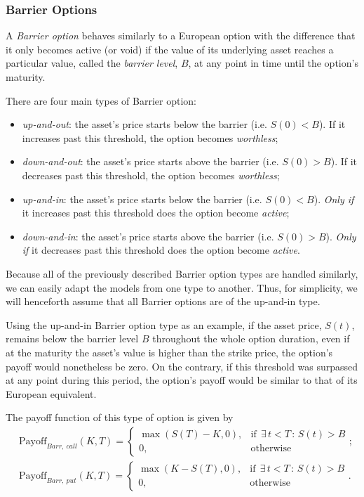 \subsubsection{Barrier Options}
A \emph{Barrier option} behaves similarly to a European option with the difference that it only becomes active (or void) if the value of its underlying asset reaches a particular value, called the \emph{barrier level}, $B$, at any point in time until the option's maturity.

There are four main types of Barrier option:
\begin{itemize}
\item \emph{up-and-out}: the asset's price starts below the barrier (i.e. $S(0)<B$). If it increases past this threshold, the option becomes \emph{worthless};
\item \emph{down-and-out}: the asset's price starts above the barrier (i.e. $S(0)>B$). If it decreases past this threshold, the option becomes \emph{worthless};
\item \emph{up-and-in}: the asset's price starts below the barrier (i.e. $S(0)<B$). \emph{Only if} it increases past this threshold does the option become \emph{active};
\item \emph{down-and-in}: the asset's price starts above the barrier (i.e. $S(0)>B$). \emph{Only if} it decreases past this threshold does the option become \emph{active}.
\end{itemize}

Because all of the previously described Barrier option types are handled similarly, we can easily adapt the models from one type to another. Thus, for simplicity, we will henceforth assume that all Barrier options are of the up-and-in type.

Using the up-and-in Barrier option type as an example, if the asset price, $S(t)$, remains below the barrier level $B$ throughout the whole option duration, even if at the maturity the asset's value is higher than the strike price, the option's payoff would nonetheless be zero. On the contrary, if this threshold was surpassed at any point during this period, the option's payoff would be similar to that of its European equivalent.


The payoff function of this type of option is given by
\begin{equation}
\begin{split}
&\text{Payoff}_{Barr,\ call}(K,T)=\begin{cases} 
      \max\left(S(T)-K,0\right), & \mathrm{if}\ \ \exists\,t<T\,:\,S(t)>B\\
      0, & \mathrm{otherwise}
   \end{cases};\\
&\text{Payoff}_{Barr,\ put}(K,T)=\begin{cases} 
      \max\left(K-S(T),0\right), & \mathrm{if}\ \ \exists\,t<T\,:\,S(t)>B\\
      0, & \mathrm{otherwise}
   \end{cases}.
\end{split}
\end{equation}



